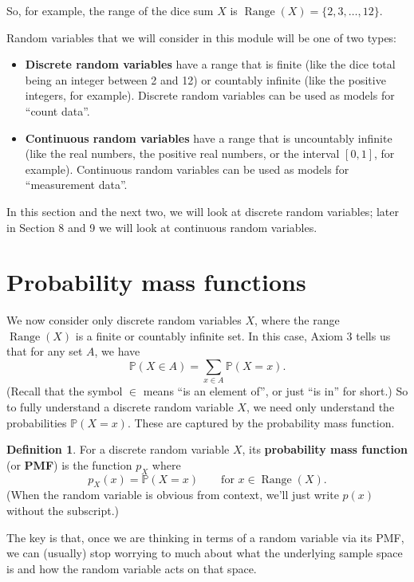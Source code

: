 \documentclass[
  a4paper,
]{book}
\providecommand{\tightlist}{%
  \setlength{\itemsep}{0pt}\setlength{\parskip}{0pt}}
\theoremstyle{definition}
\newtheorem{definition}{Definition}[chapter]
\theoremstyle{definition}
\theoremstyle{definition}
\theoremstyle{definition}
\theoremstyle{remark}
\begin{document}
So, for example, the range of the dice sum \(X\) is \(\operatorname{Range}(X) = \{2, 3, \dots, 12\}\).

Random variables that we will consider in this module will be one of two types:

\begin{itemize}
\tightlist
\item
  \textbf{Discrete random variables} have a range that is finite (like the dice total being an integer between 2 and 12) or countably infinite (like the positive integers, for example). Discrete random variables can be used as models for ``count data''.
\item
  \textbf{Continuous random variables} have a range that is uncountably infinite (like the real numbers, the positive real numbers, or the interval \([0,1]\), for example). Continuous random variables can be used as models for ``measurement data''.
\end{itemize}

In this section and the next two, we will look at discrete random variables; later in Section 8 and 9 we will look at continuous random variables.

\hypertarget{pmf}{%
\section{Probability mass functions}\label{pmf}}

We now consider only discrete random variables \(X\), where the range \(\operatorname{Range}(X)\) is a finite or countably infinite set. In this case, Axiom 3 tells us that for any set \(A\), we have
\[ \mathbb P(X \in A) = \sum_{x \in A} \mathbb P(X = x) . \]
(Recall that the symbol \(\in\) means ``is an element of'', or just ``is in'' for short.)
So to fully understand a discrete random variable \(X\), we need only understand the probabilities \(\mathbb P(X = x)\). These are captured by the probability mass function.

\begin{definition}
For a discrete random variable \(X\), its \textbf{probability mass function} (or \textbf{PMF}) is the function \(p_X\) where
\[ p_X(x) = \mathbb P(X = x)  \qquad \text{for $x \in \operatorname{Range}(X)$.} \]
(When the random variable is obvious from context, we'll just write \(p(x)\) without the subscript.)
\end{definition}

The key is that, once we are thinking in terms of a random variable via its PMF, we can (usually) stop worrying to much about what the underlying sample space is and how the random variable acts on that space.
\end{document}
